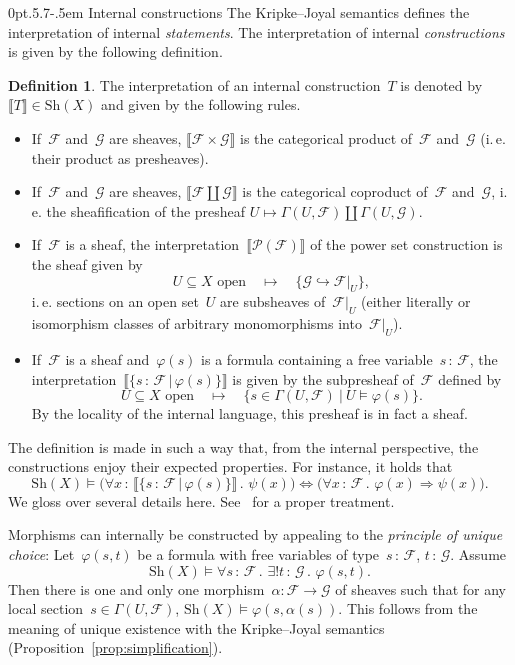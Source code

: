 \documentclass[10pt,reqno,a4paper]{amsbook}
\makeatletter
\theoremstyle{definition}
\newtheorem{defn}{Definition}[section]
\theoremstyle{plain}
\theoremstyle{remark}
\newcommand{\F}{\mathcal{F}}
\renewcommand{\G}{\mathcal{G}}
\renewcommand{\P}{\mathcal{P}}
\newcommand{\Sh}{\mathrm{Sh}}
\newcommand{\?}{\,{:}\,}
\renewcommand{\_}{\mathpunct{.}\,}
\newcommand{\brak}[1]{{\llbracket{#1}\rrbracket}}
\newcommand{\ie}{i.\,e.\@\xspace}
\def\subsection{\@startsection{subsection}{2}%
  {0pt}{.5\linespacing\@plus.7\linespacing}{-.5em}%
  {\normalfont\bfseries}}
\makeatother
\begin{document}
\subsection{Internal constructions}
\label{sect:internal-constructions}
The Kripke--Joyal semantics defines the
interpretation of internal \emph{statements}. The interpretation of internal
\emph{constructions} is given by the following definition.

\begin{defn}\label{defn:interpretation-internal-constructions}
The interpretation of an internal construction~$T$
is denoted by~$\brak{T} \in \Sh(X)$ and given by the following rules.
\begin{itemize}\item If~$\F$ and~$\G$ are sheaves, $\brak{\F \times \G}$ is the
categorical product of~$\F$ and~$\G$ (\ie their product as presheaves).
\item If~$\F$ and~$\G$ are sheaves, $\brak{\F \amalg \G}$ is the categorical
coproduct of~$\F$ and~$\G$, \ie the sheafification of the presheaf
$U \mapsto \Gamma(U,\F) \amalg \Gamma(U,\G)$.
\item If~$\F$ is a sheaf, the interpretation~$\brak{\P(\F)}$ of the power set
construction is the sheaf given by
\[ \text{$U \subseteq X$ open} \quad\longmapsto\quad \{ \G \hookrightarrow \F|_U \}, \]
\ie sections on an open set~$U$ are subsheaves of~$\F|_U$ (either literally
or isomorphism classes of arbitrary monomorphisms into~$\F|_U$).
\item If~$\F$ is a sheaf and~$\varphi(s)$ is a formula containing a free
variable~$s\?\F$, the interpretation~$\brak{\{s\?\F\,|\,\varphi(s)\}}$ is given
by the subpresheaf of~$\F$ defined by
\[ \text{$U \subseteq X$ open} \quad\longmapsto\quad \{ s \in \Gamma(U,\F) \ |\
  U \models \varphi(s) \}. \]
By the locality of the internal language, this presheaf is in fact a
sheaf.
\end{itemize}
\end{defn}

The definition is made in such a way that, from the internal perspective, the
constructions enjoy their expected properties. For instance, it holds that
\[ \Sh(X) \models
  \bigl(\forall x\?\brak{\{s\?\F \,|\, \varphi(s)\}}\_ \psi(x)\bigr)
  \Longleftrightarrow
  \bigl(\forall x\?\F\_ \varphi(x) \Rightarrow \psi(x)\bigr). \]
We gloss over several details here. See~\cite[Section~D4.1]{johnstone:elephant} for
a proper treatment.

Morphisms can internally be constructed by appealing to the \emph{principle of
unique choice}: Let~$\varphi(s,t)$ be a formula with free variables of
type~$s\?\F$, $t\?\G$. Assume
\[ \Sh(X) \models \forall s\?\F\_ \exists!t\?\G\_ \varphi(s,t). \]
Then there is one and only one morphism~$\alpha : \F \to \G$ of sheaves such
that for any local section~$s \in \Gamma(U,\F)$, $\Sh(X) \models
\varphi(s,\alpha(s))$. This follows from the meaning of unique existence with
the Kripke--Joyal semantics (Proposition~\ref{prop:simplification}).
\end{document}
